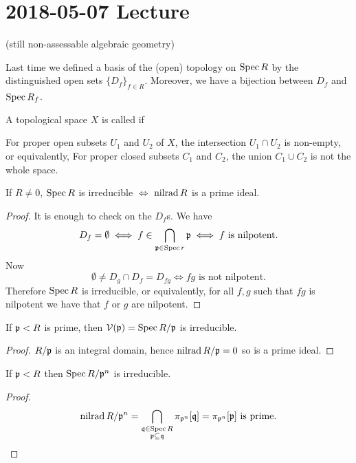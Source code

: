 \section{2018-05-07 Lecture}

(still non-assessable algebraic geometry)

Last time we defined a basis of the (open) topology on $\operatorname{Spec} R$ by the distinguished open sets $\{D_f\}_{f \in R}$.
Moreover, we have a bijection between $D_f$ and $\operatorname{Spec} R_f$.

\begin{defn}[AG.6]
  A topological space $X$ is called  if
  \begin{enum}
    \io For proper open subsets $U_1$ and $U_2$ of $X$, the intersection $U_1 \cap U_2$ is non-empty, or equivalently,
    \io For proper closed subsets $C_1$ and $C_2$, the union $C_1 \cup C_2$ is not the whole space.
  \end{enum}
\end{defn}

\begin{prop}[AG.7]
  If $R \neq 0$, $\operatorname{Spec} R$ is irreducible $\iff$ $\operatorname{nilrad} R$ is a prime ideal.
\end{prop}

\begin{proof}
  It is enough to check on the $D_f$s.
  We have
  \[D_f = \emptyset \iff f \in \bigcap_{\mathfrak{p} \in \operatorname{Spec} r} \mathfrak{p} \iff f \text{ is nilpotent}.\]
  Now
  \[ \emptyset \neq D_g \cap D_f = D_{fg} \iff fg \text{ is not nilpotent}. \]
  Therefore $\operatorname{Spec} R$ is irreducible, or equivalently, for all $f,g$ such that $fg$ is nilpotent we have that $f$ or $g$ are nilpotent.
\end{proof}

\begin{cor}[AG.8]
  If $\mathfrak{p}<R$ is prime, then $\mathcal{V}(\mathfrak{p}) = \operatorname{Spec} R/\mathfrak{p}$ is irreducible.
\end{cor}

\begin{proof}
  $R/\mathfrak{p}$ is an integral domain, hence $\operatorname{nilrad} R/\mathfrak{p}=0$ so is a prime ideal.
\end{proof}

\begin{cor}[AG.9]
  If $\mathfrak{p}<R$ then $\operatorname{Spec} R/\mathfrak{p}^n$ is irreducible.
\end{cor}

\begin{proof}
  \[\operatorname{nilrad} R/\mathfrak{p}^n = \bigcap_{\substack{\mathfrak{q} \in \operatorname{Spec} R \\ \mathfrak{p} \subseteq \mathfrak{q}}} \pi_{\mathfrak{p}^n}[\mathfrak{q}] = \pi_{\mathfrak{p}^n}[\mathfrak{p}] \text{ is prime}.\]
\end{proof}

